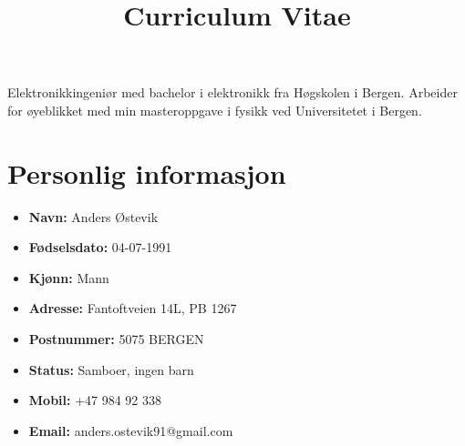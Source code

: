 \documentclass[11pt,a4paper,sans,norsk]{moderncv}        %
\title{Curriculum Vitae}                               %
\begin{document}
\makecvtitle

\small{Elektronikkingeniør med bachelor i elektronikk fra Høgskolen i Bergen. Arbeider for øyeblikket med min masteroppgave i fysikk ved Universitetet i Bergen.}

\section{Personlig informasjon}

\begin{minipage}{0.45\textwidth}
	{\renewcommand\labelitemi{}
	\begin{itemize}
	\item{\textbf{Navn:}	Anders Østevik}
	\vspace{3pt}
	\item{\textbf{Fødselsdato:}	04-07-1991}
	\vspace{3pt}
	\item{\textbf{Kjønn:}	Mann}
	\vspace{3pt}
	\item{\textbf{Adresse:}	Fantoftveien 14L, PB 1267}
	\vspace{3pt}
	\item{\textbf{Postnummer:}	5075 BERGEN}
	\vspace{3pt}
	\item{\textbf{Status:}	Samboer, ingen barn}
	\vspace{3pt}
	\item{\textbf{Mobil:}	+47 984 92 338}
	\vspace{3pt}
	\item{\textbf{Email:}	anders.ostevik91@gmail.com}

	\end{itemize}
	}
\end{minipage} \hfill
\begin{minipage}{0.85\textwidth}
	\begin{figure}[H]
	\setlength{\fboxsep}{1pt}
	\setlength{\fboxrule}{0.1pt}
	\end{figure}
\end{minipage}
\end{document}
